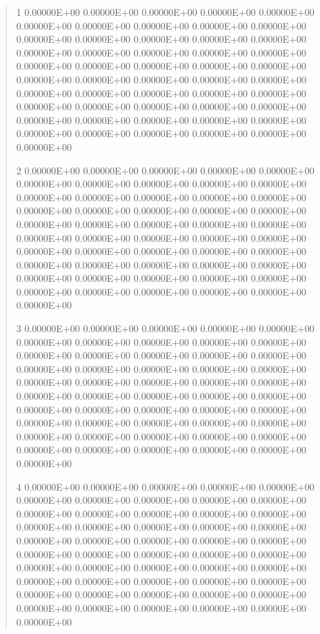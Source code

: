 \documentclass[letterpaper,10pt,english]{sphinxmanual}
\begin{document}
\begin{quote}
\begin{DUlineblock}{0em}
\item[]
\begin{DUlineblock}{\DUlineblockindent}
\item[] 1   0.00000E+00  0.00000E+00  0.00000E+00  0.00000E+00  0.00000E+00  0.00000E+00  0.00000E+00  0.00000E+00  0.00000E+00  0.00000E+00  0.00000E+00  0.00000E+00  0.00000E+00  0.00000E+00  0.00000E+00  0.00000E+00  0.00000E+00  0.00000E+00  0.00000E+00  0.00000E+00  0.00000E+00  0.00000E+00  0.00000E+00  0.00000E+00  0.00000E+00  0.00000E+00  0.00000E+00  0.00000E+00  0.00000E+00  0.00000E+00  0.00000E+00  0.00000E+00  0.00000E+00  0.00000E+00  0.00000E+00  0.00000E+00  0.00000E+00  0.00000E+00  0.00000E+00  0.00000E+00  0.00000E+00  0.00000E+00  0.00000E+00  0.00000E+00  0.00000E+00  0.00000E+00  0.00000E+00  0.00000E+00  0.00000E+00  0.00000E+00  0.00000E+00
\item[] 2   0.00000E+00  0.00000E+00  0.00000E+00  0.00000E+00  0.00000E+00  0.00000E+00  0.00000E+00  0.00000E+00  0.00000E+00  0.00000E+00  0.00000E+00  0.00000E+00  0.00000E+00  0.00000E+00  0.00000E+00  0.00000E+00  0.00000E+00  0.00000E+00  0.00000E+00  0.00000E+00  0.00000E+00  0.00000E+00  0.00000E+00  0.00000E+00  0.00000E+00  0.00000E+00  0.00000E+00  0.00000E+00  0.00000E+00  0.00000E+00  0.00000E+00  0.00000E+00  0.00000E+00  0.00000E+00  0.00000E+00  0.00000E+00  0.00000E+00  0.00000E+00  0.00000E+00  0.00000E+00  0.00000E+00  0.00000E+00  0.00000E+00  0.00000E+00  0.00000E+00  0.00000E+00  0.00000E+00  0.00000E+00  0.00000E+00  0.00000E+00  0.00000E+00
\item[] 3   0.00000E+00  0.00000E+00  0.00000E+00  0.00000E+00  0.00000E+00  0.00000E+00  0.00000E+00  0.00000E+00  0.00000E+00  0.00000E+00  0.00000E+00  0.00000E+00  0.00000E+00  0.00000E+00  0.00000E+00  0.00000E+00  0.00000E+00  0.00000E+00  0.00000E+00  0.00000E+00  0.00000E+00  0.00000E+00  0.00000E+00  0.00000E+00  0.00000E+00  0.00000E+00  0.00000E+00  0.00000E+00  0.00000E+00  0.00000E+00  0.00000E+00  0.00000E+00  0.00000E+00  0.00000E+00  0.00000E+00  0.00000E+00  0.00000E+00  0.00000E+00  0.00000E+00  0.00000E+00  0.00000E+00  0.00000E+00  0.00000E+00  0.00000E+00  0.00000E+00  0.00000E+00  0.00000E+00  0.00000E+00  0.00000E+00  0.00000E+00  0.00000E+00
\item[] 4   0.00000E+00  0.00000E+00  0.00000E+00  0.00000E+00  0.00000E+00  0.00000E+00  0.00000E+00  0.00000E+00  0.00000E+00  0.00000E+00  0.00000E+00  0.00000E+00  0.00000E+00  0.00000E+00  0.00000E+00  0.00000E+00  0.00000E+00  0.00000E+00  0.00000E+00  0.00000E+00  0.00000E+00  0.00000E+00  0.00000E+00  0.00000E+00  0.00000E+00  0.00000E+00  0.00000E+00  0.00000E+00  0.00000E+00  0.00000E+00  0.00000E+00  0.00000E+00  0.00000E+00  0.00000E+00  0.00000E+00  0.00000E+00  0.00000E+00  0.00000E+00  0.00000E+00  0.00000E+00  0.00000E+00  0.00000E+00  0.00000E+00  0.00000E+00  0.00000E+00  0.00000E+00  0.00000E+00  0.00000E+00  0.00000E+00  0.00000E+00  0.00000E+00

\end{DUlineblock}
\end{DUlineblock}
\end{quote}
\end{document}
